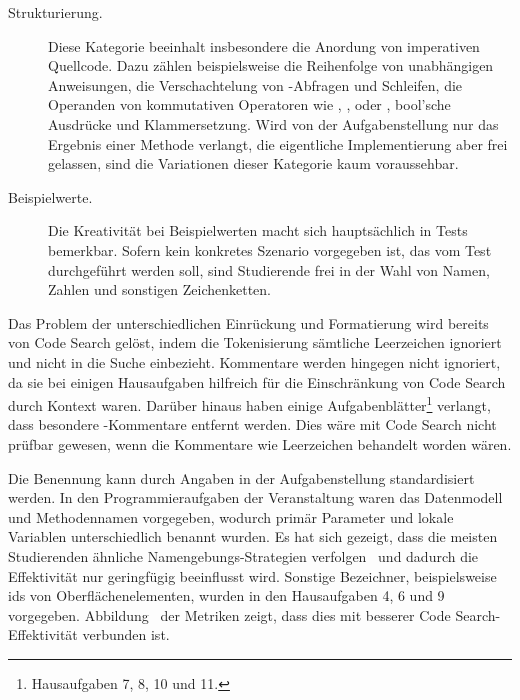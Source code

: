 \begin{description}
{    }
    \item[Strukturierung.]
    Diese Kategorie beeinhalt insbesondere die Anordung von imperativen Quellcode.
    Dazu zählen beispielsweise die Reihenfolge von unabhängigen Anweisungen, die Verschachtelung von -Abfragen und Schleifen, die Operanden von kommutativen Operatoren wie \code{+}, \code{*}, \code{&&} oder \code{||}, bool'sche Ausdrücke und Klammersetzung.
    Wird von der Aufgabenstellung nur das Ergebnis einer Methode verlangt, die eigentliche Implementierung aber frei gelassen, sind die Variationen dieser Kategorie kaum voraussehbar.
    \item[Beispielwerte.]
    Die Kreativität bei Beispielwerten macht sich hauptsächlich in Tests bemerkbar.
    Sofern kein konkretes Szenario vorgegeben ist, das vom Test durchgeführt werden soll, sind Studierende frei in der Wahl von Namen, Zahlen und sonstigen Zeichenketten.
\end{description}

Das Problem der unterschiedlichen Einrückung und Formatierung wird bereits von Code Search gelöst, indem die Tokenisierung sämtliche Leerzeichen ignoriert und nicht in die Suche einbezieht.
Kommentare werden hingegen nicht ignoriert, da sie bei einigen Hausaufgaben hilfreich für die Einschränkung von Code Search durch Kontext waren.
Darüber hinaus haben einige Aufgabenblätter\footnote{
    Hausaufgaben 7, 8, 10 und 11.
} verlangt, dass besondere -Kommentare entfernt werden.
Dies wäre mit Code Search nicht prüfbar gewesen, wenn die Kommentare wie Leerzeichen behandelt worden wären.

Die Benennung kann durch Angaben in der Aufgabenstellung standardisiert werden.
In den Programmieraufgaben der Veranstaltung waren das Datenmodell und Methodennamen vorgegeben, wodurch primär Parameter und lokale Variablen unterschiedlich benannt wurden.
Es hat sich gezeigt, dass die meisten Studierenden ähnliche Namengebungs-Strategien verfolgen~ und dadurch die Effektivität nur geringfügig beeinflusst wird.
Sonstige Bezeichner, beispielsweise \acp{id} von Oberflächenelementen, wurden in den Hausaufgaben 4, 6 und 9 vorgegeben.
Abbildung~ der Metriken zeigt, dass dies mit besserer Code Search-Effektivität verbunden ist.

